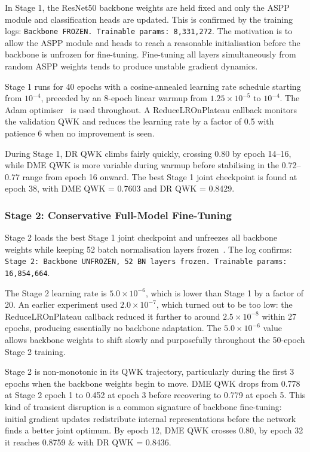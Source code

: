 \documentclass[12pt,a4paper]{article}
\begin{document}
In Stage 1, the ResNet50 backbone weights are held fixed and only the ASPP module and classification heads are updated. This is confirmed by the training logs: \texttt{Backbone FROZEN. Trainable params: 8,331,272}. The motivation is to allow the ASPP module and heads to reach a reasonable initialisation before the backbone is unfrozen for fine-tuning. Fine-tuning all layers simultaneously from random ASPP weights tends to produce unstable gradient dynamics.

Stage 1 runs for 40 epochs with a cosine-annealed learning rate schedule starting from $10^{-4}$, preceded by an 8-epoch linear warmup from $1.25 \times 10^{-5}$ to $10^{-4}$. The Adam optimiser~\cite{Kingma2014Adam} is used throughout. A ReduceLROnPlateau callback monitors the validation QWK and reduces the learning rate by a factor of 0.5 with patience 6 when no improvement is seen.

During Stage 1, DR QWK climbs fairly quickly, crossing 0.80 by epoch 14--16, while DME QWK is more variable during warmup before stabilising in the 0.72--0.77 range from epoch 16 onward. The best Stage 1 joint checkpoint is found at epoch 38, with DME QWK = 0.7603 and DR QWK = 0.8429.

\subsubsection{Stage 2: Conservative Full-Model Fine-Tuning}

Stage 2 loads the best Stage 1 joint checkpoint and unfreezes all backbone weights while keeping 52 batch normalisation layers frozen~\cite{Ioffe2015BatchNorm}. The log confirms: \texttt{Stage 2: Backbone UNFROZEN, 52 BN layers frozen. Trainable params: 16,854,664}.

The Stage 2 learning rate is $5.0 \times 10^{-6}$, which is lower than Stage 1 by a factor of 20. An earlier experiment used $2.0 \times 10^{-7}$, which turned out to be too low: the ReduceLROnPlateau callback reduced it further to around $2.5 \times 10^{-8}$ within 27 epochs, producing essentially no backbone adaptation. The $5.0 \times 10^{-6}$ value allows backbone weights to shift slowly and purposefully throughout the 50-epoch Stage 2 training.

Stage 2 is non-monotonic in its QWK trajectory, particularly during the first 3 epochs when the backbone weights begin to move. DME QWK drops from 0.778 at Stage 2 epoch 1 to 0.452 at epoch 3 before recovering to 0.779 at epoch 5. This kind of transient disruption is a common signature of backbone fine-tuning: initial gradient updates redistribute internal representations before the network finds a better joint optimum. By epoch 12, DME QWK crosses 0.80, by epoch 32 it reaches 0.8759 \& with DR QWK = 0.8436.
\end{document}
